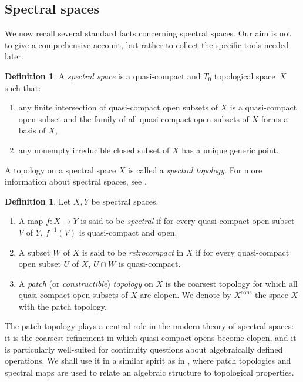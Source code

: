 \documentclass[10pt, reqno]{amsart}
\theoremstyle{plain}
\theoremstyle{definition}
\newtheorem{definition}[theorem]{Definition}
\begin{document}
\subsection{Spectral spaces}
We now recall several standard facts concerning spectral spaces. Our aim is not to give a comprehensive account, but rather to collect the specific tools needed later. 
\begin{definition}\cite[Proposition 4]{Hochster}
    A \emph{spectral space} is a quasi-compact and $T_0$ topological space~$X$ such that: 
    \begin{enumerate}[label=(\arabic*)]
        \item any finite intersection of quasi-compact open subsets of $X$ is a quasi-compact open subset and the family of all quasi-compact open subsets of $X$ forms a basis of $X$, 
        \item any nonempty irreducible closed subset of $X$ has a unique generic point. 
    \end{enumerate}
    A topology on a spectral space $X$ is called a \emph{spectral topology}. For more information about spectral spaces, see \cite{Dickmann_Schwartz_Tressl_2019}.
\end{definition}
\begin{definition}\cite[Section 2]{Finocchiaro2019SupremaIS}
    Let $X, Y$ be spectral spaces. 
    \begin{enumerate}[label=(\arabic*)]
        \item A map $f : X \rightarrow Y$ is said to be \emph{spectral} if for every quasi-compact open subset $V$ of $Y$, $f^{-1}(V)$ is quasi-compact and open.
        \item A subset $W$ of $X$ is said to be \emph{retrocompact} in $X$ if for every quasi-compact open subset $U$ of $X$, $U \cap W$ is quasi-compact.
        \item A \emph{patch} (or \emph{constructible}) \emph{topology} on $X$ is the coarsest topology for which all quasi-compact open subsets of $X$ are clopen. We denote by $X^\mathrm{cons}$ the space $X$ with the patch topology.
    \end{enumerate}  
\end{definition} 
\noindent The patch topology plays a central role in the modern theory of spectral spaces: it is the coarsest refinement in which quasi-compact opens become clopen, and it is particularly well-suited for continuity questions about algebraically defined operations. We shall use it in a similar spirit as in \cite{Finocchiaro2019SupremaIS}, where patch topologies and spectral maps are used to relate an algebraic structure to topological properties. 
\end{document}
